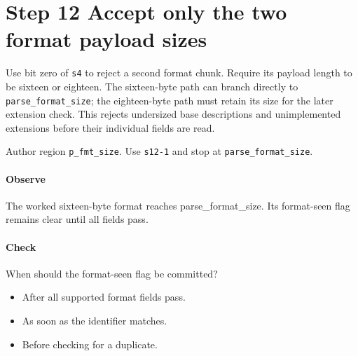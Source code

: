 \section{Step 12 Accept only the two format payload sizes}\label{pcm-wav-s12}
Use bit zero of \texttt{s4} to reject a second format chunk. Require its payload length to be sixteen or eighteen. The sixteen-byte path can branch directly to \texttt{parse\_format\_size}; the eighteen-byte path must retain its size for the later extension check. This rejects undersized base descriptions and unimplemented extensions before their individual fields are read.

Author region \texttt{p\_fmt\_size}. Use \texttt{s12-1} and stop at \texttt{parse\_format\_size}.

\paragraph{Observe} The worked sixteen-byte format reaches parse\_format\_size. Its format-seen flag remains clear until all fields pass.

\paragraph{Check} When should the format-seen flag be committed?
\begin{itemize}
  \item[A.] After all supported format fields pass.
  \item[B.] As soon as the identifier matches.
  \item[C.] Before checking for a duplicate.
\end{itemize}
